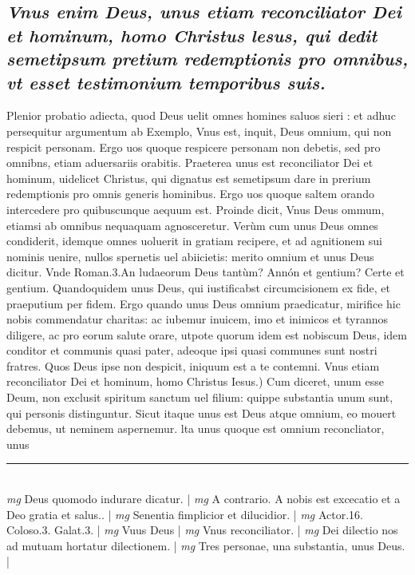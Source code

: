 \documentclass{article}
\begin{document}
\begin{pages}
\subsection*{\textit{Vnus enim Deus, unus etiam reconciliator Dei et hominum, homo Christus lesus, qui dedit semetipsum pretium redemptionis pro omnibus, vt esset testimonium temporibus suis. }}\pstart Plenior probatio adiecta, quod Deus uelit omnes homines saluos sieri : et adhuc persequitur argumentum ab Exemplo, Vnus est, inquit, Deus omnium, qui non respicit personam. Ergo uos quoque respicere personam non debetis, sed pro omnibns, etiam aduersariis orabitis. Praeterea unus est reconciliator Dei et hominum, uidelicet Christus, qui dignatus est semetipsum dare in prerium redemptionis pro omnis generis hominibus. Ergo uos quoque saltem orando intercedere pro quibuscunque aequum est. Proinde dicit, Vnus Deus ommum, etiamsi ab omnibus nequaquam agnosceretur. Verùm cum unus Deus omnes condiderit, idemque  omnes uoluerit in gratiam recipere, et ad agnitionem sui nominis uenire, nullos spernetis uel abiicietis: merito omnium et unus Deus dicitur. Vnde Roman.3.An ludaeorum Deus tantùm? Annón et gentium? Certe et gentium. Quandoquidem unus Deus, qui iustificabst circumcisionem ex fide, et praeputium per fidem. Ergo quando unus Deus omnium praedicatur, mirifice hic nobis commendatur charitas: ac iubemur inuicem, imo et inimicos et tyrannos diligere, ac pro eorum salute orare, utpote quorum idem est nobiscum Deus, idem conditor et communis quasi pater, adeoque  ipsi quasi communes sunt nostri fratres. Quos Deus ipse non despicit, iniquum est a te contemni.  \pend\pstart Vnus etiam reconciliator Dei et hominum, homo Christus Iesus.) Cum diceret, unum esse Deum, non exclusit spiritum sanctum uel filium: quippe substantia unum sunt, qui personis distinguntur. Sicut itaque unus est Deus atque omnium, eo mouert debemus, ut neminem aspernemur. lta unus quoque est omnium reconcliator, unus  \pend
\vspace{0.5cm}\noindent
\vspace{0.2cm}\rule{1cm}{0.2pt}\\ 
\hspace{0.2cm}\textit{mg}
\footnotesize Deus quomodo indurare dicatur. 
\normalsize| 
\hspace{0.2cm}\textit{mg}
\footnotesize A contrario. A nobis est excecatio et a Deo gratia et salus.. 
\normalsize| 
\hspace{0.2cm}\textit{mg}
\footnotesize Senentia fimplicior et dilucidior. 
\normalsize| 
\hspace{0.2cm}\textit{mg}
\footnotesize Actor.16. Coloso.3. Galat.3. 
\normalsize| 
\hspace{0.2cm}\textit{mg}
\footnotesize Vuus Deus 
\normalsize| 
\hspace{0.2cm}\textit{mg}
\footnotesize Vnus reconciliator. 
\normalsize| 
\hspace{0.2cm}\textit{mg}
\footnotesize Dei dilectio nos ad mutuam hortatur dilectionem. 
\normalsize| 
\hspace{0.2cm}\textit{mg}
\footnotesize Tres personae, una substantia, unus Deus. 
\normalsize| 

\end{pages}
\end{document}
